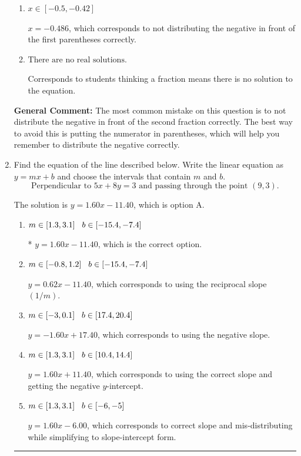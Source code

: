 \documentclass{extbook}[14pt]
\newcommand{\litem}[1]{\item #1

\rule{\textwidth}{0.4pt}}
\begin{document}
\begin{enumerate}
{\begin{enumerate}[label=\Alph*.]
$x = 0.486$, which corresponds to not distributing the negative in front of the second parentheses correctly.
\item \( x \in [-0.5, -0.42] \)

$x = -0.486$, which corresponds to not distributing the negative in front of the first parentheses correctly.
\item \( \text{There are no real solutions.} \)

Corresponds to students thinking a fraction means there is no solution to the equation.
\end{enumerate}

\textbf{General Comment:} The most common mistake on this question is to not distribute the negative in front of the second fraction correctly. The best way to avoid this is putting the numerator in parentheses, which will help you remember to distribute the negative correctly.
}
\litem{
Find the equation of the line described below. Write the linear equation as $ y=mx+b $ and choose the intervals that contain $m$ and $b$.
\[ \text{Perpendicular to } 5 x + 8 y = 3 \text{ and passing through the point } (9, 3). \]

The solution is \( y = 1.60x - 11.40 \), which is option A.\begin{enumerate}[label=\Alph*.]
\item \( m \in [1.3, 3.1] \hspace*{3mm} b \in [-15.4, -7.4] \)

* $y = 1.60x - 11.40$, which is the correct option.
\item \( m \in [-0.8, 1.2] \hspace*{3mm} b \in [-15.4, -7.4] \)

 $y = 0.62x - 11.40$, which corresponds to using the reciprocal slope $(1/m)$.
\item \( m \in [-3, 0.1] \hspace*{3mm} b \in [17.4, 20.4] \)

 $y = -1.60x + 17.40$, which corresponds to using the negative slope.
\item \( m \in [1.3, 3.1] \hspace*{3mm} b \in [10.4, 14.4] \)

 $y = 1.60x + 11.40$, which corresponds to using the correct slope and getting the negative $y$-intercept.
\item \( m \in [1.3, 3.1] \hspace*{3mm} b \in [-6, -5] \)

 $y = 1.60x - 6.00$, which corresponds to correct slope and mis-distributing while simplifying to slope-intercept form.
\end{enumerate}

}
\end{enumerate}
\end{document}
